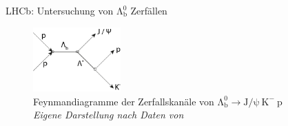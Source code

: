 \documentclass[aspectratio=169]{beamer} %
\begin{document}
\begin{frame}{LHCb: Untersuchung von $\mathrm{\Lambda_b^0}$ Zerfällen}
{\begin{figure}
          \hspace{2cm}
          \includegraphics[width=0.3\textwidth]{FeynmanDiag/lambda.png}
          \caption{Feynmandiagramme der Zerfallskanäle von $\mathrm{\Lambda_b^0} \to \mathrm{J}/\mathrm{\psi}\:\mathrm{K}^-\:\mathrm{p}$\\\tiny \emph{Eigene Darstellung nach Daten von \textcite{Aaij.2015}}}
      \end{figure}}
  \end{frame}
\end{document}
